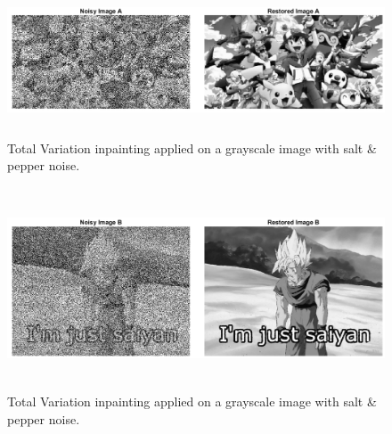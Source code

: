 \documentclass[a4paper,11pt]{article}
\begin{document}
\begin{figure}[!htb]
  \centering
  \includegraphics[width=16cm, height=4.5cm]{1.png}
  \caption{\small Total Variation inpainting applied on a grayscale image with salt \& pepper noise.}
\end{figure}

\begin{figure}[!htb]
  \centering
  \includegraphics[width=16cm, height=6cm]{2.png}
  \caption{\small Total Variation inpainting applied on a grayscale image with salt \& pepper noise.}
\end{figure}
\end{document}
